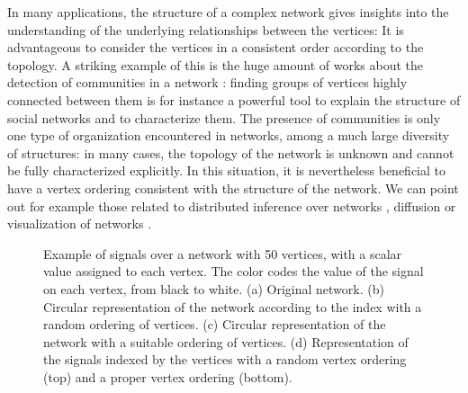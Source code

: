 \documentclass{scrartcl}
\theoremstyle{plain}
\begin{document}
In many applications, the structure of a complex network gives insights into the 
understanding of the underlying relationships between the vertices: It is 
advantageous to consider the vertices in a consistent order according to the 
topology. A striking example of this is the huge amount of works about the 
detection of communities in a network \cite{Fortunato2010}: finding groups of 
vertices highly connected between them is for instance a powerful tool to 
explain the structure of social networks and to characterize them. The presence 
of communities is only one type of organization encountered in networks, among a 
much large diversity of structures: in many cases, the topology of the network 
is unknown and cannot be fully characterized explicitly. In this situation, it 
is nevertheless beneficial to have a vertex ordering consistent with the 
structure of the network. We can point out for example those related to 
distributed inference over networks \cite{Kar2013}, diffusion \cite{Chamley2013} 
or visualization of networks \cite{Bertrand2013}.

\begin{figure}[!ht]
  \centering
  
    \hspace{0.3cm}
    \hspace{0.3cm}
    \hspace{0.3cm}

\caption{\label{fig:son}Example of signals over a network with 50 vertices, with 
a scalar value assigned to each vertex. The color codes the value of the signal 
on each vertex, from black to white. (a) Original network. (b) Circular 
representation of the network according to the index with a random ordering of 
vertices. (c) Circular representation of the network with a suitable ordering of 
vertices. (d) Representation of the signals indexed by the vertices with a 
random vertex ordering (top) and a proper vertex ordering (bottom).}

\end{figure}
\end{document}

